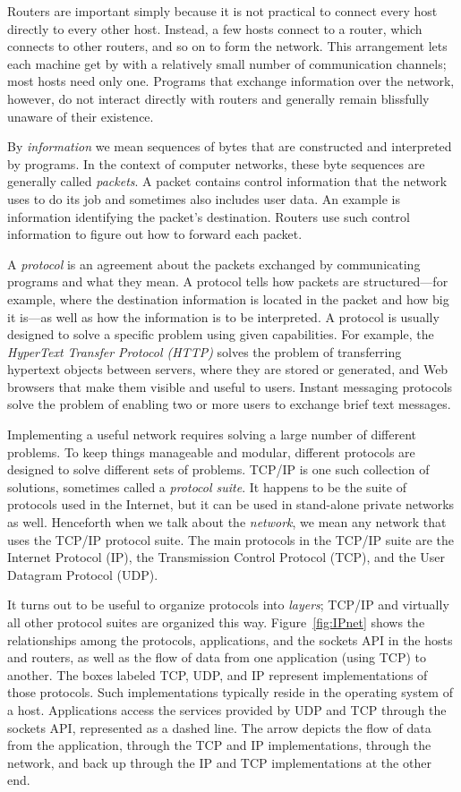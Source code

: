 Routers are important simply because it is not practical to connect
every host directly to every other host. Instead, a few hosts connect
to a router, which connects to other routers, and so on to form the
network.  This arrangement lets each machine get by with a relatively
small number of communication channels; most hosts need only one.
Programs that exchange information over the network, however, do not
interact directly with routers and generally remain blissfully unaware
of their existence.

By \emph{information} we mean sequences of {bytes} that are
constructed and interpreted by programs. In the context of computer
networks, these byte sequences are generally called \emph{packets}.  A
packet contains control information that the network uses to do its
job and sometimes also includes user data.  An example is information
identifying the packet's destination. Routers use such control
information to figure out how to forward each packet.

A \emph{protocol} is an agreement about the packets exchanged by
communicating programs and what they mean.  A protocol tells how
packets are structured---for example, where the destination
information is located in the packet and how big it is---as well as
how the information is to be interpreted.  A protocol is usually
designed to solve a specific problem using given capabilities.  For
example, the \emph{HyperText Transfer Protocol (HTTP)} solves the
problem of transferring hypertext objects between servers, where they
are stored or generated,
and Web browsers that make them visible and useful to users.
Instant messaging protocols solve the problem of enabling two or more
users to exchange brief text messages.

Implementing a useful network requires solving a large number of
different problems. To keep things manageable and modular,
different protocols are designed to solve different sets of problems.
TCP/IP is one such collection of solutions, sometimes called a
\emph{protocol suite}.  It happens to be the suite of protocols used
in the Internet, but it can be used in stand-alone private networks as
well.  Henceforth when we talk about the \emph{network}, we mean any
network that uses the TCP/IP protocol suite.  The main protocols in
the TCP/IP suite are the Internet Protocol (IP), the Transmission
Control Protocol (TCP), and the User Datagram Protocol (UDP).

It turns out to be useful to organize protocols into \emph{layers};
TCP/IP and virtually all other protocol suites are organized this way.
Figure~\ref{fig:IPnet} shows the relationships among the protocols,
applications, and the sockets API in the hosts and routers, as well as
the flow of data from one application (using TCP) to another.  The
boxes labeled TCP, UDP, and IP represent implementations of those
protocols. Such implementations typically reside in the operating
system of a host.  Applications access the services provided by UDP
and TCP through the sockets API, represented as a dashed line.  The arrow 
depicts the flow of data
from the application, through the TCP and IP implementations, through
the network, and back up through the IP and TCP implementations at the
other end.

